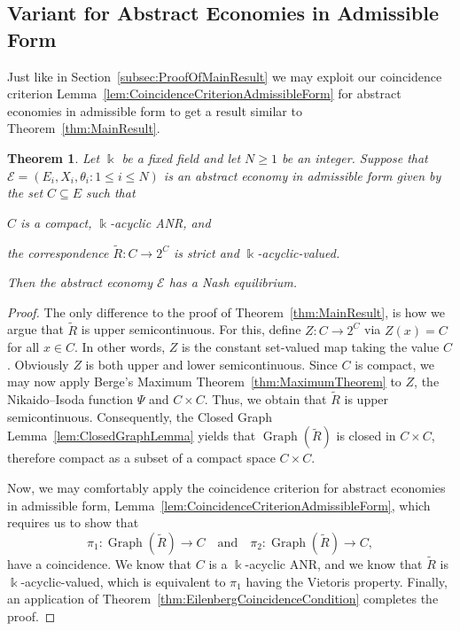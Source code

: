 \documentclass[a4paper,11pt,reqno,english]{amsart}
\newtheorem{theorem}{Theorem}[section]
\theoremstyle{definition}
\begin{document}
\subsection{Variant for Abstract Economies in Admissible Form}
Just like in Section~\ref{subsec:ProofOfMainResult} we may exploit our coincidence criterion Lemma~\ref{lem:CoincidenceCriterionAdmissibleForm} for abstract economies in admissible form to get a result similar to Theorem~\ref{thm:MainResult}.
\begin{theorem}\label{thm:MainResultAdmissibleForm}
	Let $\Bbbk$ be a fixed field and let $N\geq 1$ be an integer.
	Suppose that $\mathcal{E}=(E_i,X_i,\theta_i : 1\leq i\leq N)$ is an abstract economy in admissible form given by the set $C\subseteq E$ such that
	\begin{compactenum}[\rm \quad (1)]
		\item $C$ is a compact, $\Bbbk$-acyclic {\rm ANR}, and
		\item the correspondence $\widetilde{R}\colon C\longrightarrow 2^C$ is strict and $\Bbbk$-acyclic-valued.
	\end{compactenum}
	Then the abstract economy $\mathcal{E}$ has a Nash equilibrium.
\end{theorem}
\begin{proof}
	The only difference to the proof of Theorem~\ref{thm:MainResult}, is how we argue that $\widetilde{R}$ is upper semicontinuous. For this, define $Z\colon C\longrightarrow 2^C$ via $Z(x)= C$ for all $x\in C$. In other words, $Z$ is the constant set-valued map taking the value $C$. Obviously $Z$ is both upper and lower semicontinuous. Since $C$ is compact, we may now apply Berge's Maximum Theorem~\ref{thm:MaximumTheorem} to $Z$, the Nikaido--Isoda function $\Psi$ and $C\times C$. Thus, we obtain that $\widetilde{R}$ is upper semicontinuous. Consequently, the Closed Graph Lemma~\ref{lem:ClosedGraphLemma} yields that $\operatorname{Graph}(\widetilde{R})$ is closed in $C\times C$, therefore compact as a subset of a compact space $C\times C$.

	Now, we may comfortably apply the coincidence criterion for abstract economies in admissible form, Lemma~\ref{lem:CoincidenceCriterionAdmissibleForm}, which requires us to show that
	\begin{displaymath}
		\pi_1 \colon \operatorname{Graph}(\widetilde{R})\longrightarrow C \quad \text{and}\quad \pi_2 \colon \operatorname{Graph}(\widetilde{R})\longrightarrow C,
	\end{displaymath}
	have a coincidence. We know that $C$ is a $\Bbbk$-acyclic ANR, and we know that $\widetilde{R}$ is $\Bbbk$-acyclic-valued, which is equivalent to $\pi_1$ having the Vietoris property. Finally, an application of Theorem~\ref{thm:EilenbergCoincidenceCondition} completes the proof.
\end{proof}
\end{document}
